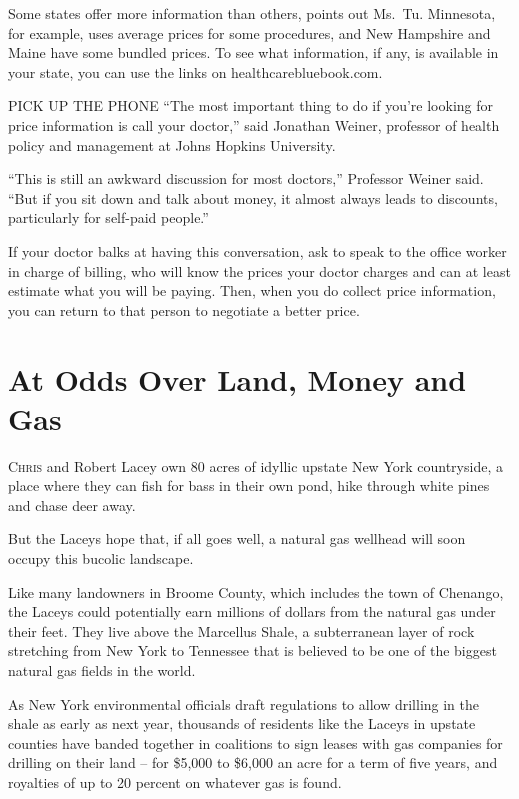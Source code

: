 ﻿\documentclass[12pt]{article}
\begin{document}
Some states offer more information than others, points out Ms.~Tu. Minnesota, for example, uses
average prices for some procedures, and New Hampshire and Maine have some bundled prices. To see
what information, if any, is available in your state, you can use the links on
healthcarebluebook.com.

PICK UP THE PHONE ``The most important thing to do if you're looking for price information is call
your doctor,'' said Jonathan Weiner, professor of health policy and management at Johns Hopkins
University.

``This is still an awkward discussion for most doctors,'' Professor Weiner said. ``But if you sit
down and talk about money, it almost always leads to discounts, particularly for self-paid people.''

If your doctor balks\cite{balk} at having this conversation, ask to speak to the office worker in
charge of billing, who will know the prices your doctor charges and can at least estimate what you
will be paying. Then, when you do collect price information, you can return to that person to
negotiate a better price.

\section{At Odds Over Land, Money and Gas}

\lettrine{C}{hris} and Robert Lacey own 80 acres of idyllic\cite{idyllic}
upstate New York countryside, a place where they can fish for bass in their own pond, hike through
white pines and chase deer away.

But the Laceys hope that, if all goes well, a natural gas wellhead will soon occupy this bucolic
landscape.

Like many landowners in Broome County, which includes the town of Chenango, the Laceys could
potentially earn millions of dollars from the natural gas under their feet. They live above the
Marcellus Shale\cite{shale}, a subterranean layer of rock stretching from New York to Tennessee that
is believed to be one of the biggest natural gas fields in the world.

As New York environmental officials draft regulations to allow drilling in the shale as early as
next year, thousands of residents like the Laceys in upstate counties have banded together in
coalitions to sign leases with gas companies for drilling on their land -- for \$5,000 to \$6,000 an
acre for a term of five years, and royalties of up to 20 percent on whatever gas is found.
\end{document}
